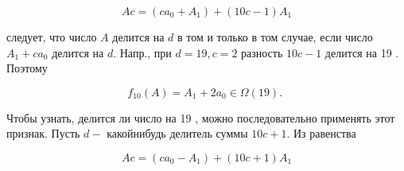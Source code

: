 \documentclass[10pt]{article}
\begin{document}
\[

A c=\left(c a_{0}+A_{1}\right)+(10 c-1) A_{1}

\]



следует, что число $A$ делится на $d$ в том и только в том случае, если число $A_{1}+c a_{0}$ делится на $d$. Напр., при $d=19, c=2$ разность $10 c-1$ делится на 19 . Поэтому



\[

f_{10}(A)=A_{1}+2 a_{0} \in \Omega(19) \text {. }

\]



Чтобы узнать, делится ли число на 19 , можно последовательно применять этот признак. Пусть $d-$ какойнибудь делитель суммы $10 c+1$. Из равенства



\[

A c=\left(c a_{0}-A_{1}\right)+(10 c+1) A_{1}

\]
\end{document}
